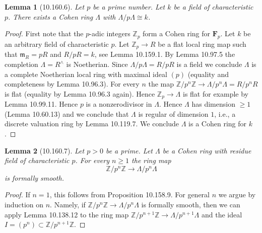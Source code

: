 \documentclass[UTF8,11pt]{ctexart}
\newtheorem*{lemma}{Lemma}
\theoremstyle{definition}
\newcommand{\Z}{\mathbb Z}
\begin{document}
\begin{lemma}[10.160.6]
Let $p$ be a prime number. Let $k$ be a field of characteristic $p$. There exists a Cohen ring $\Lambda$ with $\Lambda/p\Lambda\cong k$.
\end{lemma}
\begin{proof}
First note that the $p$-adic integers $\Z_p$ form a Cohen ring for $\mathbf F_p$. Let $k$ be an arbitrary field of characteristic $p$. Let $\Z_p\to R$ be a flat local ring map such that $\mathfrak m_R=pR$ and $R/pR=k$, see Lemma 10.159.1. By Lemma 10.97.5 the completion $\Lambda=R^\wedge$ is Noetherian. Since $\Lambda/p\Lambda=R/pR$ is a field we conclude $\Lambda$ is a complete Noetherian local ring with maximal ideal $(p)$ (equality and completeness by Lemma 10.96.3). For every $n$ the map $\Z/p^n\Z\to\Lambda/p^n\Lambda=R/p^nR$ is flat (equality by Lemma 10.96.3 again). Hence $\Z_p\to\Lambda$ is flat for example by Lemma 10.99.11. Hence $p$ is a nonzerodivisor in $\Lambda$. Hence $\Lambda$ has dimension $\geq1$ (Lemma 10.60.13) and we conclude that $\Lambda$ is regular of dimension $1$, i.e., a discrete valuation ring by Lemma 10.119.7. We conclude $\Lambda$ is a Cohen ring for $k$.
\end{proof}
\begin{lemma}[10.160.7]
Let $p>0$ be a prime. Let $\Lambda$ be a Cohen ring with residue field of characteristic $p$. For every $n\geq1$ the ring map
\[
\Z/p^n\Z\to\Lambda/p^n\Lambda
\]
is formally smooth.
\end{lemma}
\begin{proof}
If $n=1$, this follows from Proposition 10.158.9. For general $n$ we argue by induction on $n$. Namely, if $\Z/p^n\Z\to\Lambda/p^n\Lambda$ is formally smooth, then we can apply Lemma 10.138.12 to the ring map $\Z/p^{n+1}\Z\to\Lambda/p^{n+1}\Lambda$ and the ideal $I=(p^n)\subset\Z/p^{n+1}\Z$.
\end{proof}
\end{document}

